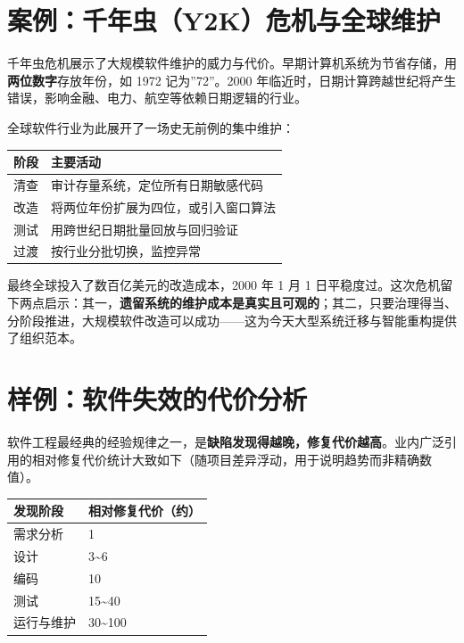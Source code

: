 \documentclass[
]{ctexbook}
\newcounter{none}
\begin{document}
\section{案例：千年虫（Y2K）危机与全球维护}\label{ux6848ux4f8bux5343ux5e74ux866by2kux5371ux673aux4e0eux5168ux7403ux7ef4ux62a4}

千年虫危机展示了大规模软件维护的威力与代价。早期计算机系统为节省存储，用\textbf{两位数字}存放年份，如
1972 记为''72''。2000
年临近时，日期计算跨越世纪将产生错误，影响金融、电力、航空等依赖日期逻辑的行业。

全球软件行业为此展开了一场史无前例的集中维护：

{\def\LTcaptype{none} %
\begin{longtable}[]{@{}ll@{}}
\toprule\noalign{}
阶段 & 主要活动 \\
\midrule\noalign{}
\endhead
\bottomrule\noalign{}
\endlastfoot
清查 & 审计存量系统，定位所有日期敏感代码 \\
改造 & 将两位年份扩展为四位，或引入窗口算法 \\
测试 & 用跨世纪日期批量回放与回归验证 \\
过渡 & 按行业分批切换，监控异常 \\
\end{longtable}
}

最终全球投入了数百亿美元的改造成本，2000 年 1 月 1
日平稳度过。这次危机留下两点启示：其一，\textbf{遗留系统的维护成本是真实且可观的}；其二，只要治理得当、分阶段推进，大规模软件改造可以成功------这为今天大型系统迁移与智能重构提供了组织范本。

\section{样例：软件失效的代价分析}\label{ux6837ux4f8bux8f6fux4ef6ux5931ux6548ux7684ux4ee3ux4ef7ux5206ux6790}

软件工程最经典的经验规律之一，是\textbf{缺陷发现得越晚，修复代价越高}。业内广泛引用的相对修复代价统计大致如下（随项目差异浮动，用于说明趋势而非精确数值）。

{\def\LTcaptype{none} %
\begin{longtable}[]{@{}ll@{}}
\toprule\noalign{}
发现阶段 & 相对修复代价（约） \\
\midrule\noalign{}
\endhead
\bottomrule\noalign{}
\endlastfoot
需求分析 & 1 \\
设计 & 3\textasciitilde6 \\
编码 & 10 \\
测试 & 15\textasciitilde40 \\
运行与维护 & 30\textasciitilde100 \\
\end{longtable}
}
\end{document}
